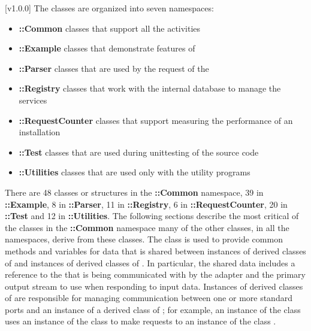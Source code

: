 [v1.0.0]
The \mplusm{} classes are organized into seven namespaces:
\begin{itemize}
\item\textbf{\mplusm{}::Common} classes that support all the \mplusm{} activities
\item\exSp\textbf{\mplusm{}::Example} classes that demonstrate features of \mplusm{}
\item\exSp\textbf{\mplusm{}::Parser} classes that are used by the
 request of the
\item\exSp\textbf{\mplusm{}::Registry} classes that work with the internal database to
manage the \mplusm{} services
\item\exSp\textbf{\mplusm{}::RequestCounter} classes that support measuring the
performance of an \mplusm{} installation
\item\exSp\textbf{\mplusm{}::Test} classes that are used during unit\longDash{}testing of
the \mplusm{} source code
\item\exSp\textbf{\mplusm{}::Utilities} classes that are used only with the \mplusm{}
utility programs
\end{itemize}
There are 48 classes or structures in the \textbf{\mplusm{}::Common} namespace, 39 in
\textbf{\mplusm{}::Example}, 8 in \textbf{\mplusm{}::Parser}, 11 in
\textbf{\mplusm{}::Registry}, 6 in \textbf{\mplusm{}::RequestCounter}, 20 in
\textbf{\mplusm{}::Test} and 12 in \textbf{\mplusm{}::Utilities}.
The following sections describe the most critical of the classes in the
\textbf{\mplusm{}::Common} namespace \longDash{} many of the other classes, in all the
namespaces, derive from these classes.
The class  is used to provide common methods and
variables for data that is shared between instances of derived classes of
 and instances of derived classes of
.
In particular, the shared data includes a reference to the 
that is being communicated with by the adapter and the primary output stream to use when
responding to input data.
Instances of derived classes of  are responsible
for managing \mplusm{} communication between one or more standard \yarp{} ports and an
instance of a derived class of ; for example, an instance
of the class  uses an instance of the class
 to make requests to an instance of the class
.\\

